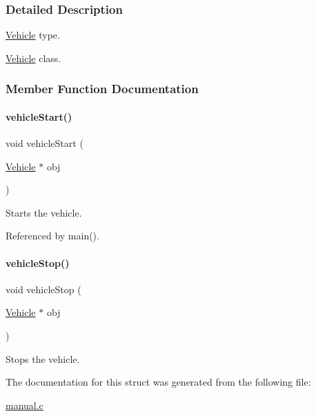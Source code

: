 \subsubsection{Detailed Description}
\mbox{\hyperlink{struct_vehicle}{Vehicle}} type. 

\mbox{\hyperlink{struct_vehicle}{Vehicle}} class. 

\subsubsection{Member Function Documentation}
\mbox{\label{struct_vehicle_a6891d3d28853bc3fdd075596dc6de9f8}} 
\paragraph{\texorpdfstring{vehicleStart()}{vehicleStart()}}
{\footnotesize\ttfamily void vehicle\+Start (\begin{DoxyParamCaption}\item[{\mbox{\hyperlink{struct_vehicle}{Vehicle}} $\ast$}]{obj }\end{DoxyParamCaption})}

Starts the vehicle. 

Referenced by main().

\mbox{\label{struct_vehicle_a4dcbcba43792dcd673a552b14479ab77}} 
\paragraph{\texorpdfstring{vehicleStop()}{vehicleStop()}}
{\footnotesize\ttfamily void vehicle\+Stop (\begin{DoxyParamCaption}\item[{\mbox{\hyperlink{struct_vehicle}{Vehicle}} $\ast$}]{obj }\end{DoxyParamCaption})}

Stops the vehicle. 

The documentation for this struct was generated from the following file\+:\begin{DoxyCompactItemize}
\item 
\mbox{\hyperlink{manual_8c}{manual.\+c}}\end{DoxyCompactItemize}
